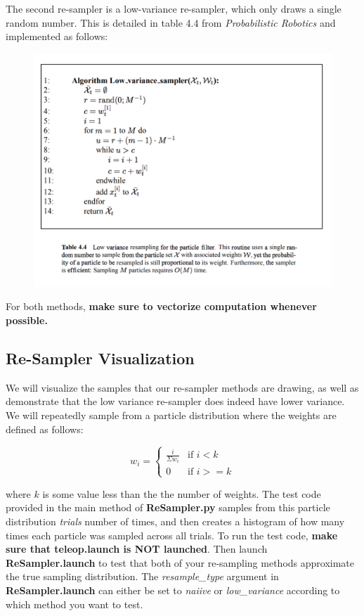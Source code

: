 \documentclass[final]{article}
\begin{document}
The second re-sampler is a low-variance re-sampler, which only draws a single random number. This is detailed in table 4.4 from \textit{Probabilistic Robotics} and implemented as follows:

\begin{figure}[h]
\centering
\includegraphics[width=12cm]{figs/low_var.png}
\end{figure}


%

For both methods, \textbf{make sure to vectorize computation whenever possible.}

\subsection{Re-Sampler Visualization}
We will visualize the samples that our re-sampler methods are drawing, as well as demonstrate that the low variance re-sampler does indeed have lower variance. We will repeatedly sample from a particle distribution where the weights are defined as follows:

\[
	w_i = 
	\begin{cases}
	\frac{i}{\Sigma w_i} & \text{if } i < k\\
	0 & \text{if } i >= k
	\end{cases}
\]

where $k$ is some value less than the the number of weights. The test code provided in the main method of \textbf{ReSampler.py} samples from this particle distribution \textit{trials} number of times, and then creates a histogram of how many times each particle was sampled across all trials. To run the test code, \textbf{make sure that teleop.launch is NOT launched}. Then launch \textbf{ReSampler.launch} to test that both of your re-sampling methods approximate the true sampling distribution.  The \textit{resample\_type} argument in \textbf{ReSampler.launch} can either be set to \textit{naiive} or \textit{low\_variance} according to which method you want to test. 
\end{document}
